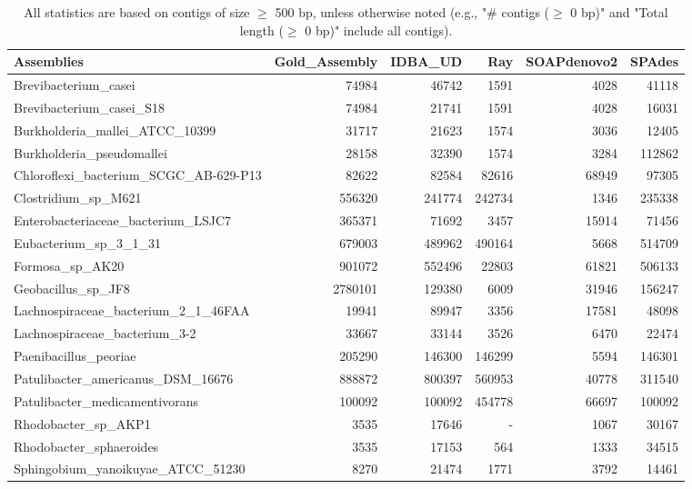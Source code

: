 \documentclass[12pt,a4paper]{article}
\begin{document}
\begin{table}[ht]
\begin{center}
\caption{All statistics are based on contigs of size $\geq$ 500 bp, unless otherwise noted (e.g., "\# contigs ($\geq$ 0 bp)" and "Total length ($\geq$ 0 bp)" include all contigs).}
\begin{tabular}{|l*{5}{|r}|}
\hline
Assemblies & Gold\_Assembly & IDBA\_UD & Ray & SOAPdenovo2 & SPAdes \\ \hline
Brevibacterium\_casei & 74984 & 46742 & 1591 & 4028 & 41118 \\ \hline
Brevibacterium\_casei\_S18 & 74984 & 21741 & 1591 & 4028 & 16031 \\ \hline
Burkholderia\_mallei\_ATCC\_10399 & 31717 & 21623 & 1574 & 3036 & 12405 \\ \hline
Burkholderia\_pseudomallei & 28158 & 32390 & 1574 & 3284 & 112862 \\ \hline
Chloroflexi\_bacterium\_SCGC\_AB-629-P13 & 82622 & 82584 & 82616 & 68949 & 97305 \\ \hline
Clostridium\_sp\_M621 & 556320 & 241774 & 242734 & 1346 & 235338 \\ \hline
Enterobacteriaceae\_bacterium\_LSJC7 & 365371 & 71692 & 3457 & 15914 & 71456 \\ \hline
Eubacterium\_sp\_3\_1\_31 & 679003 & 489962 & 490164 & 5668 & 514709 \\ \hline
Formosa\_sp\_AK20 & 901072 & 552496 & 22803 & 61821 & 506133 \\ \hline
Geobacillus\_sp\_JF8 & 2780101 & 129380 & 6009 & 31946 & 156247 \\ \hline
Lachnospiraceae\_bacterium\_2\_1\_46FAA & 19941 & 89947 & 3356 & 17581 & 48098 \\ \hline
Lachnospiraceae\_bacterium\_3-2 & 33667 & 33144 & 3526 & 6470 & 22474 \\ \hline
Paenibacillus\_peoriae & 205290 & 146300 & 146299 & 5594 & 146301 \\ \hline
Patulibacter\_americanus\_DSM\_16676 & 888872 & 800397 & 560953 & 40778 & 311540 \\ \hline
Patulibacter\_medicamentivorans & 100092 & 100092 & 454778 & 66697 & 100092 \\ \hline
Rhodobacter\_sp\_AKP1 & 3535 & 17646 & - & 1067 & 30167 \\ \hline
Rhodobacter\_sphaeroides & 3535 & 17153 & 564 & 1333 & 34515 \\ \hline
Sphingobium\_yanoikuyae\_ATCC\_51230 & 8270 & 21474 & 1771 & 3792 & 14461 \\ \hline

\end{tabular}
\end{center}
\end{table}
\end{document}
